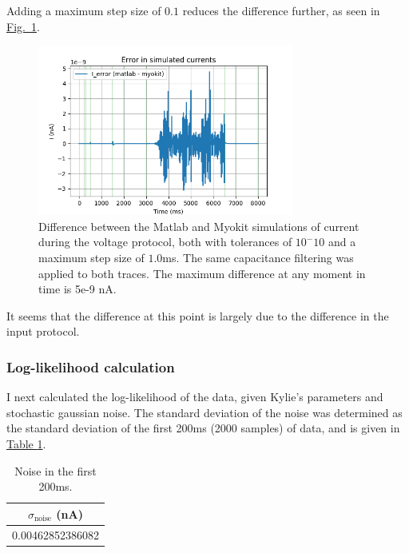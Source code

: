 \documentclass[preprint,authoryear,10pt]{elsarticle}
\newcommand{\startrowcolors}{\rowcolors{2}{gray!15}{white}}
\newcommand*{\thead}[1]{\bfseries #1}
\newcommand\fig[2][]{\hyperref[fig:#2]{Fig.~\ref*{fig:#2}\ifstrempty{#1}{}{.#1}}}
\newcommand{\tab}[1]{\hyperref[tab:#1]{Table \ref*{tab:#1}}}
\begin{document}
Adding a maximum step size of $0.1$ reduces the difference further, as seen in
 \fig{sine-wave-current-error-tol10-max-step}.

\begin{figure}[H]
\centerline{
\includegraphics[width=0.75\textwidth]{fig/sine-wave-current-error-tol10-max-step}
}
\caption{%
Difference between the Matlab and Myokit simulations of current during the
 voltage protocol, both with tolerances of $10^-10$ and a maximum step size of
 $1.0$ms.
The same capacitance filtering was applied to both traces.
The maximum difference at any moment in time is 5e-9 nA.
}
\label{fig:sine-wave-current-error-tol10-max-step}
\end{figure}

It seems that the difference at this point is largely due to the difference in
 the input protocol.



\subsubsection{Log-likelihood calculation}

I next calculated the log-likelihood of the data, given Kylie's parameters and
 stochastic gaussian noise.
The standard deviation of the noise was determined as the standard deviation
 of the first 200ms (2000 samples) of data, and is given in
 \tab{sine-wave-noise}.

\begin{table}[H]
\centering
\caption{Noise in the first 200ms.}
\label{tab:sine-wave-noise}
\startrowcolors
\footnotesize
\begin{tabular}{c}
\hline
\thead{$\sigma_\text{noise}$ (nA)}  \\
\hline
0.00462852386082 \\
\hline
\end{tabular}
\end{table}
\end{document}

